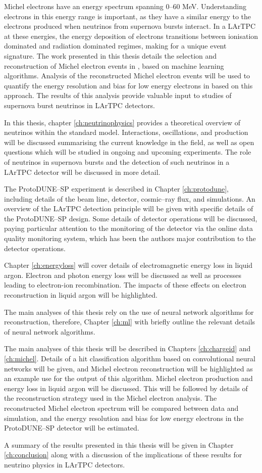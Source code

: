 Michel electrons have an energy spectrum spanning 0--60 MeV. Understanding
electrons in this energy range is important, as they have a similar energy to 
the electrons produced when neutrinos from supernova bursts interact. In a 
LArTPC at these energies, the energy deposition of electrons transitions 
between ionisation dominated and radiation dominated regimes, making for a 
unique event signature\cite{Acciarri:2017sjy}. The work presented in this 
thesis details the selection and reconstruction of Michel electron events in 
\protodune{}, based on machine learning algorithms. Analysis of the 
reconstructed Michel electron events will be used to quantify the energy 
resolution and bias for low energy electrons in \protodune{} based on this 
approach. The results of this analysis provide valuable input to studies of 
supernova burst neutrinos in LArTPC detectors.

In this thesis, chapter \ref{ch:neutrinophysics} provides a theoretical 
overview of neutrinos within the standard model. Interactions, oscillations, 
and production will be discussed summarising the current knowledge in the 
field, as well as open questions which will be studied in ongoing and upcoming 
experiments. The role of neutrinos in supernova bursts and the detection of 
such neutrinos in a LArTPC detector will be discussed in more detail.

The ProtoDUNE--SP experiment is described in Chapter \ref{ch:protodune},
including details of the beam line, detector, cosmic--ray flux, and simulations.
An overview of the LArTPC detection principle will be given with specific
details of the ProtoDUNE--SP design. Some details of detector operations will be
discussed, paying particular attention to the monitoring of the detector via the
online data quality monitoring system, which has been the authors major 
contribution to the detector operations.

Chapter \ref{ch:energyloss} will cover details of electromagnetic energy loss
in liquid argon. Electron and photon energy loss will be discussed as well as
processes leading to electron-ion recombination. The impacts of these effects on
electron reconstruction in liquid argon will be highlighted.

The main analyses of this thesis rely on the use of neural network algorithms
for reconstruction, therefore, Chapter \ref{ch:ml} with briefly outline the
relevant details of neural network algorithms.

The main analyses of this thesis will be described in Chapters
\ref{ch:chargeid} and \ref{ch:michel}. Details of a hit classification
algorithm based on convolutional neural networks will be given, and Michel
electron reconstruction will be highlighted as an example use for the output of
this algorithm. Michel electron production and energy loss in liquid argon will
be discussed. This will be followed by details of the reconstruction strategy
used in the Michel electron analysis. The reconstructed Michel electron spectrum
will be compared between data and simulation, and the energy resolution and 
bias for low energy electrons in the ProtoDUNE--SP detector will be estimated. 

A summary of the results presented in this thesis will be given in Chapter
\ref{ch:conclusion} along with a discussion of the implications of these
results for neutrino physics in LArTPC detectors.
